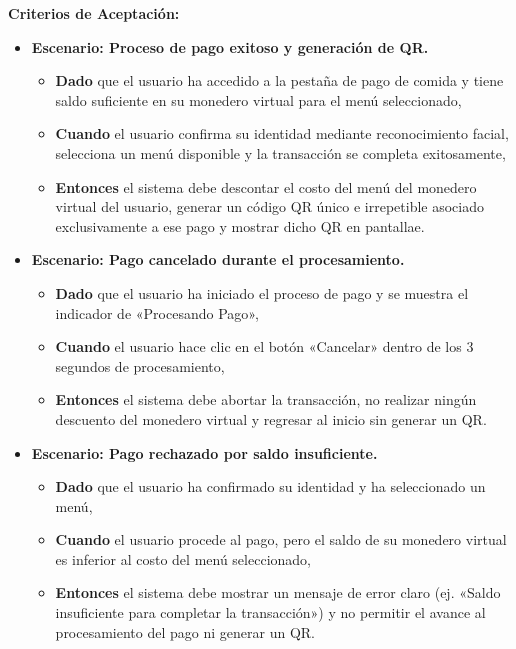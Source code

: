 \documentclass[12pt]{article}
\begin{document}
\textbf{Criterios de Aceptación:}
\begin{itemize}
    \item \textbf{Escenario: Proceso de pago exitoso y generación de QR.}
    \begin{itemize}
        \item \textbf{Dado} que el usuario ha accedido a la pestaña de pago de comida y tiene saldo suficiente en su monedero virtual para el menú seleccionado,
        \item \textbf{Cuando} el usuario confirma su identidad mediante reconocimiento facial, selecciona un menú disponible y la transacción se completa exitosamente,
        \item \textbf{Entonces} el sistema debe descontar el costo del menú del monedero virtual del usuario, generar un código QR único e irrepetible asociado exclusivamente a ese pago y mostrar dicho QR en pantallae.
    \end{itemize}

    \item \textbf{Escenario: Pago cancelado durante el procesamiento.}
    \begin{itemize}
        \item \textbf{Dado} que el usuario ha iniciado el proceso de pago y se muestra el indicador de «Procesando Pago»,
        \item \textbf{Cuando} el usuario hace clic en el botón «Cancelar» dentro de los 3 segundos de procesamiento,
        \item \textbf{Entonces} el sistema debe abortar la transacción, no realizar ningún descuento del monedero virtual y regresar al inicio sin generar un QR.
    \end{itemize}

    \item \textbf{Escenario: Pago rechazado por saldo insuficiente.}
    \begin{itemize}
        \item \textbf{Dado} que el usuario ha confirmado su identidad y ha seleccionado un menú,
        \item \textbf{Cuando} el usuario procede al pago, pero el saldo de su monedero virtual es inferior al costo del menú seleccionado,
        \item \textbf{Entonces} el sistema debe mostrar un mensaje de error claro (ej. «Saldo insuficiente para completar la transacción») y no permitir el avance al procesamiento del pago ni generar un QR.
    \end{itemize}


\end{itemize}
\end{document}
